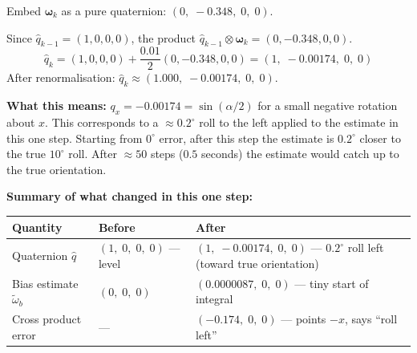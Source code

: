\documentclass[12pt, a4paper]{article}
\begin{document}
\begin{notebox}
  Embed $\boldsymbol{\omega}_k$ as a pure quaternion:
  $(0,\;-0.348,\;0,\;0)$.

  Since $\hat{q}_{k-1} = (1,0,0,0)$, the product
  $\hat{q}_{k-1}\otimes\boldsymbol{\omega}_k = (0,-0.348,0,0)$.
  \[
    \hat{q}_k
    = (1,0,0,0) + \frac{0.01}{2}(0,-0.348,0,0)
    = (1,\;-0.00174,\;0,\;0)
  \]
  After renormalisation: $\hat{q}_k \approx (1.000,\;-0.00174,\;0,\;0)$.

  \textbf{What this means:} $q_x = -0.00174 = \sin(\alpha/2)$ for a small
  negative rotation about $x$.
  This corresponds to a $\approx 0.2^\circ$ roll to the left applied to
  the estimate in this one step.
  Starting from $0^\circ$ error, after this step the estimate is $0.2^\circ$
  closer to the true $10^\circ$ roll.
  After $\approx 50$ steps ($0.5$ seconds) the estimate would catch up to
  the true orientation.

  \textbf{Summary of what changed in this one step:}

  \medskip
  \begin{tabular}{@{} l p{4.5cm} p{5.5cm} @{}}
    \toprule
    Quantity & Before & After \\
    \midrule
    Quaternion $\hat{q}$ &
      $(1,\;0,\;0,\;0)$ --- level &
      $(1,\;-0.00174,\;0,\;0)$ --- $0.2^\circ$ roll left
      (toward true orientation) \\[4pt]
    Bias estimate $\tilde{\omega}_{b}$ &
      $(0,\;0,\;0)$ &
      $(0.0000087,\;0,\;0)$ --- tiny start of integral \\[4pt]
    Cross product error &
      --- &
      $(-0.174,\;0,\;0)$ --- points $-x$, says ``roll left'' \\
    \bottomrule
  \end{tabular}
\end{notebox}
\end{document}
